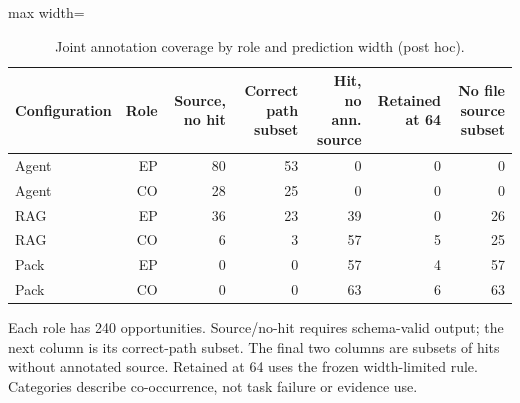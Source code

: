 \begin{table}[t]
\centering\small
\caption{Joint annotation coverage by role and prediction width (post hoc).}\label{tab:role-width}
\begin{adjustbox}{max width=\textwidth}\begin{tabular}{lrrrrrr}
\toprule
Configuration & Role & Source, no hit & Correct path subset & Hit, no ann. source & Retained at 64 & No file source subset \\
\midrule
Agent & EP & 80 & 53 & 0 & 0 & 0 \\
Agent & CO & 28 & 25 & 0 & 0 & 0 \\
RAG & EP & 36 & 23 & 39 & 0 & 26 \\
RAG & CO & 6 & 3 & 57 & 5 & 25 \\
Pack & EP & 0 & 0 & 57 & 4 & 57 \\
Pack & CO & 0 & 0 & 63 & 6 & 63 \\
\bottomrule
\end{tabular}\end{adjustbox}
\par\vspace{3pt}\begin{minipage}{\textwidth}\footnotesize Each role has 240 opportunities. Source/no-hit requires schema-valid output; the next column is its correct-path subset. The final two columns are subsets of hits without annotated source. Retained at 64 uses the frozen width-limited rule. Categories describe co-occurrence, not task failure or evidence use.\end{minipage}
\end{table}
